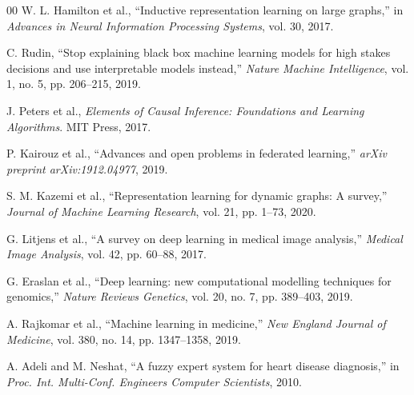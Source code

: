 \documentclass[conference]{IEEEtran}
\begin{document}
\begin{thebibliography}{00}
W. L. Hamilton et al., ``Inductive representation learning on large graphs,'' in \textit{Advances in Neural Information Processing Systems}, vol. 30, 2017.

C. Rudin, ``Stop explaining black box machine learning models for high stakes decisions and use interpretable models instead,'' \textit{Nature Machine Intelligence}, vol. 1, no. 5, pp. 206--215, 2019.

J. Peters et al., \textit{Elements of Causal Inference: Foundations and Learning Algorithms}. MIT Press, 2017.

P. Kairouz et al., ``Advances and open problems in federated learning,'' \textit{arXiv preprint arXiv:1912.04977}, 2019.

S. M. Kazemi et al., ``Representation learning for dynamic graphs: A survey,'' \textit{Journal of Machine Learning Research}, vol. 21, pp. 1--73, 2020.

G. Litjens et al., ``A survey on deep learning in medical image analysis,'' \textit{Medical Image Analysis}, vol. 42, pp. 60--88, 2017.

G. Eraslan et al., ``Deep learning: new computational modelling techniques for genomics,'' \textit{Nature Reviews Genetics}, vol. 20, no. 7, pp. 389--403, 2019.

A. Rajkomar et al., ``Machine learning in medicine,'' \textit{New England Journal of Medicine}, vol. 380, no. 14, pp. 1347--1358, 2019.

A. Adeli and M. Neshat, ``A fuzzy expert system for heart disease diagnosis,'' in \textit{Proc. Int. Multi-Conf. Engineers Computer Scientists}, 2010.

\end{thebibliography}
\end{document}
